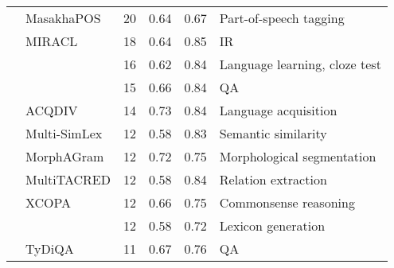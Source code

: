 \begin{tabular}{llrlll}
	\citet{dione-etal-2023-masakhapos}            & MasakhaPOS             & 20                              & 0.64\lowcov                     & 0.67                            & Part-of-speech tagging              \\
	\citet{zhang-etal-2023-miracl}                & MIRACL                 & 18                              & 0.64                            & 0.85                            & IR                                  \\
	\citet{palma-gomez-etal-2023-using}           &                        & 16                              & 0.62\lowcov                     & 0.84                            & Language learning, cloze test       \\
	\citet{asai-etal-2022-mia}                    &                        & 15                              & 0.66                            & 0.84                            & QA                                  \\
	\citet{jancso-etal-2020-acqdiv}               & ACQDIV                 & 14                              & 0.73\lowcov                     & 0.84                            & Language acquisition                \\
	\citet{vulic-etal-2020-multi}                 & Multi-SimLex           & 12                              & 0.58                            & 0.83                            & Semantic similarity                 \\
	\citet{eskander-etal-2020-morphagram}         & MorphAGram             & 12                              & 0.72\lowcov                     & 0.75                            & Morphological segmentation          \\
	\citet{hennig-etal-2023-multitacred}          & MultiTACRED            & 12                              & 0.58                            & 0.84                            & Relation extraction                 \\
	\citet{ponti-etal-2020-xcopa}                 & XCOPA                  & 12                              & 0.66                            & 0.75\missing                    & Commonsense reasoning               \\
	\citet{buechel-etal-2020-learning-evaluating} &                        & 12                              & 0.58                            & 0.72                            & Lexicon generation                  \\
	\citet{clark-etal-2020-tydi}                  & TyDiQA                 & 11                              & 0.67                            & 0.76                            & QA                                  \\

\end{tabular}

